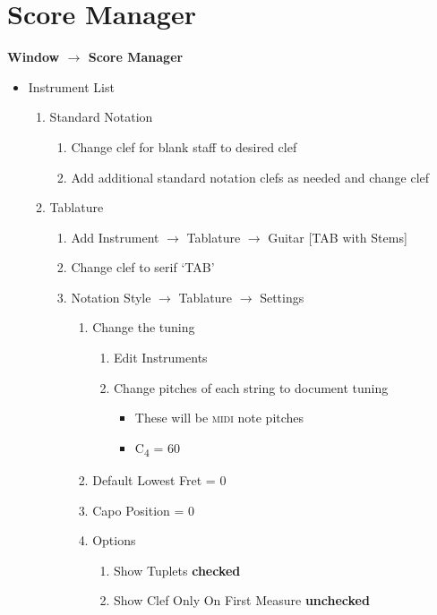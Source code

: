 \documentclass[]{memoir}
\begin{document}
\section{Score Manager}
\label{sec:score-manager}

\textbf{Window $\rightarrow$ Score Manager}

\begin{itemize}
\item Instrument List
  \begin{enumerate}
  \item Standard Notation
    \begin{enumerate}
    \item Change clef for blank staff to desired clef
    \item Add additional standard notation clefs as needed and change
      clef
    \end{enumerate}
  \item Tablature
    \begin{enumerate}
    \item Add Instrument $\rightarrow$ Tablature $\rightarrow$ Guitar [TAB with Stems]
    \item Change clef to serif `TAB'
    \item Notation Style $\rightarrow$ Tablature $\rightarrow$ Settings
      \begin{enumerate}
      \item Change the tuning
        \begin{enumerate}
        \item Edit Instruments
        \item Change pitches of each string to document tuning
          \begin{itemize}
          \item These will be \textsc{midi} note pitches
          \item C\textsubscript{4} = 60
          \end{itemize}
        \end{enumerate}
      \item Default Lowest Fret = 0
      \item Capo Position = 0
      \item Options
        \begin{enumerate}
        \item Show Tuplets \textbf{checked}
        \item Show Clef Only On First Measure \textbf{unchecked}
        \end{enumerate}

\end{enumerate}
\end{enumerate}
\end{enumerate}
\end{itemize}
\end{document}
